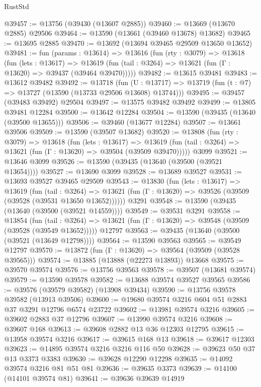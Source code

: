 \begin{lexlean}{RustStd}
\begin{coremodule}
@39457 := @13756 (@39430 (@13607 @2885))
@39460 := @13669 (@13670 @2885) @29506
@39464 := @13590 (@13661 (@39460 @13678) @13682)
@39465 := @13695 @2885
@39470 := @13692 (@13694 @39465 @29509 @13650 @13652)
@39481 := fun (params : @13614) =>
  @13616
    (fun (rty : @3079) =>
    @13618
      (fun (lets : @13617) =>
      @13619 (fun (tail : @3264) => @13621 (fun (Γ : @13620) => @39437 (@39464 @39470)))))
@39482 := @13615 @39481
@39483 := @13612 @39482
@39492 := @13718
    (fun (U : @13717) => @13719 (fun (t : @7) => @13727 (@13590 (@13733 @29506 @13608) @13744)))
@39495 := @39457 (@39483 @39492) @29504
@39497 := @13575 @39482 @39492
@39499 := @13805 @39481 @12284
@39500 := @13642 @12284
@39504 := @13590 (@39435 (@13640 (@39500 @13655)))
@39506 := @39460 (@13677 @12284)
@39507 := @13661 @39506
@39509 := @13590 (@39507 @13682)
@39520 := @13808
    (fun (rty : @3079) =>
    @13618
      (fun (lets : @13617) =>
      @13619 (fun (tail : @3264) => @13621 (fun (Γ : @13620) => @39504 (@39509 @39470)))))
    @3099
@39521 := @13646 @3099
@39526 := @13590 (@39435 (@13640 (@39500 (@39521 @13654))))
@39527 := @13690 @3099
@39528 := @13689 @39527
@39531 := @13693 @39527 @39465 @29509
@39543 := @13830
    (fun (lets : @13617) =>
    @13619
      (fun (tail : @3264) =>
      @13621 (fun (Γ : @13620) => @39526 (@39509 (@39528 (@39531 @13650 @13652))))))
    @3291
@39548 := @13590 (@39435 (@13640 (@39500 (@39521 @14559))))
@39549 := @39531 @3291
@39558 := @13854
    (fun (tail : @3264) => @13621 (fun (Γ : @13620) => @39548 (@39509 (@39528 (@39549 @13652)))))
    @12797
@39563 := @39435 (@13640 (@39500 (@39521 (@13649 @12798))))
@39564 := @13590 @39563
@39565 := @39549 @12797
@39570 := @13872 (fun (Γ : @13620) => @39564 (@39509 (@39528 @39565)))
@39574 := @13885 (@13888 (@22273 @13893)) @13668
@39575 := @39570 @39574
@39576 := @13756 @39563
@39578 := @39507 (@13681 @39574)
@39579 := @13590 @39578
@39582 := @13688 @39574 @39527 @39565
@39586 := @39576 (@39579 @39582) (@13908 @39434)
@39590 := @13756 @39578 @39582 (@13913 @39506)
@39600 := @19680 @39574 @3216 @604 @51 @2883 @37 @3291 @12796 @6574 @23722
@39602 := @13981 @39574 @3216
@39605 := @39602 @2883 @37 @12796
@39607 := @13990 @39574 @3216
@39608 := @39607 @168
@39613 := @39608 @2882 @13 @36 @12303 @12795
@39615 := @13958 @39574 @3216
@39617 := @39615 @168 @13
@39618 := @39617 @12303
@39623 := @14895 @39574 @3216 @3216 @116 @50
@39628 := @39623 @50 @37 @13 @3373 @3383
@39630 := @39628 @12290 @12298
@39635 := @14092 @39574 @3216 @81 @51 @81
@39636 := @39635 @3373
@39639 := @14100 (@14101 @39574 @81)
@39641 := @39636 @39639 @14919

\end{coremodule}
\end{lexlean}
